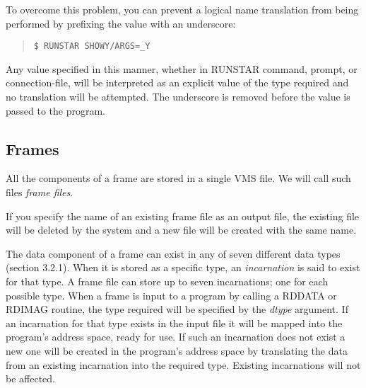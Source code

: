 \documentclass{article}
\begin{document}
\begin{description}
To overcome this problem, you can prevent a logical name translation from being
performed by prefixing the value with an underscore:
\begin{quote}
{\tt \$ RUNSTAR SHOWY/ARGS=\_Y}
\end{quote}
Any value specified in this manner, whether in RUNSTAR command, prompt, or
connection-file, will be interpreted as an explicit value of the type required
and no translation will be attempted.
The underscore is removed before the value is passed to the program.
\end{description}
\subsection {Frames}
All the components of a frame are stored in a single VMS file.
We will call such files {\em frame files}.

If you specify the name of an existing frame file as an output file,
the existing file will be deleted by the system and a new file will be created
with the same name.

The data component of a frame can exist in any of seven different data types
(section 3.2.1).
When it is stored as a specific type, an {\em incarnation} is said to exist for that
type.
A frame file can store up to seven incarnations; one for each possible type.
When a frame is input to a program by calling a RDDATA or RDIMAG routine, the
type required will be specified by the {\em dtype} argument.
If an incarnation for that type exists in the input file it will be mapped into
the program's address space, ready for use.
If such an incarnation does not exist a new one will be created in the
program's address space by translating the data from an existing incarnation
into the required type.
Existing incarnations will not be affected.
\end{document}
